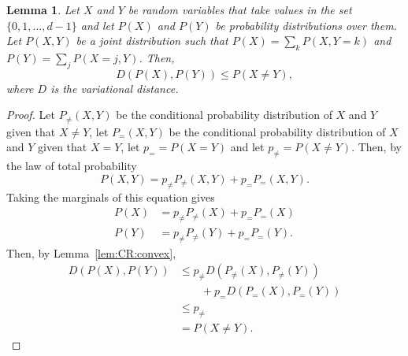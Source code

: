 \documentclass[DIV=calc,fontsize=12pt]{scrartcl} %
\theoremstyle{definition}
\theoremstyle{plain}
\newtheorem{lemma}[definition]{Lemma}
\begin{document}
\begin{lemma}
\label{lem:CR:couple}
Let $X$ and $Y$ be random variables that take values in the set
$\{0,1,\ldots,d-1\}$ and let $P(X)$ and $P(Y)$ be probability
distributions over them.  Let $P(X,Y)$ be a joint distribution such
that $P(X) = \sum_k P(X,Y=k)$ and $P(Y) = \sum_j P(X=j, Y)$.  Then,
\begin{equation}
D \left ( P(X),P(Y) \right ) \leq P(X \neq Y),
\end{equation}
where $D$ is the variational distance.
\end{lemma}
\begin{proof}
Let $P_{\neq}(X,Y)$ be the conditional probability distribution of
$X$ and $Y$ given that $X \neq Y$, let $P_{=}(X,Y)$ be the
conditional probability distribution of $X$ and $Y$ given that
$X=Y$, let $p_= = P(X=Y)$ and let $p_{\neq} = P(X \neq Y)$.  Then,
by the law of total probability
\begin{equation}
P(X,Y) = p_{\neq}P_{\neq}(X,Y)  + p_{=}P_{=}(X,Y).
\end{equation}
Taking the marginals of this equation gives
\begin{align}
P(X) & = p_{\neq}P_{\neq}(X) + p_{=}P_{=}(X) \\
P(Y) & = p_{\neq}P_{\neq}(Y) + p_{=}P_{=}(Y).
\end{align}
Then, by Lemma~\ref{lem:CR:convex},
\begin{align}
D(P(X),P(Y)) & \leq p_{\neq} D(P_{\neq}(X), P_{\neq}(Y)) \nonumber\\
&\quad\quad + p_{=}
D(P_{=}(X),P_{=}(Y))  \\
& \leq p_{\neq} \\
& = P(X \neq Y).
\end{align}
\end{proof}
\end{document}
